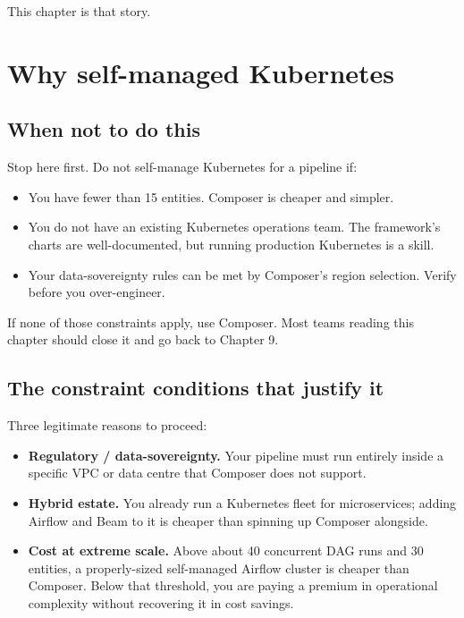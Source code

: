 \documentclass[
  11pt,
  british,
  oneside]{book}
\providecommand{\tightlist}{%
  \setlength{\itemsep}{0pt}\setlength{\parskip}{0pt}}
\begin{document}
This chapter is that story.

\hypertarget{why-self-managed-kubernetes}{%
\section{Why self-managed
Kubernetes}\label{why-self-managed-kubernetes}}

\hypertarget{when-not-to-do-this}{%
\subsection{When not to do this}\label{when-not-to-do-this}}

Stop here first. Do not self-manage Kubernetes for a pipeline if:

\begin{itemize}
\tightlist
\item
  You have fewer than 15 entities. Composer is cheaper and simpler.
\item
  You do not have an existing Kubernetes operations team. The
  framework's charts are well-documented, but running production
  Kubernetes is a skill.
\item
  Your data-sovereignty rules can be met by Composer's region selection.
  Verify before you over-engineer.
\end{itemize}

If none of those constraints apply, use Composer. Most teams reading
this chapter should close it and go back to Chapter 9.

\hypertarget{the-constraint-conditions-that-justify-it}{%
\subsection{The constraint conditions that justify
it}\label{the-constraint-conditions-that-justify-it}}

Three legitimate reasons to proceed:

\begin{itemize}
\tightlist
\item
  \textbf{Regulatory / data-sovereignty.} Your pipeline must run
  entirely inside a specific VPC or data centre that Composer does not
  support.
\item
  \textbf{Hybrid estate.} You already run a Kubernetes fleet for
  microservices; adding Airflow and Beam to it is cheaper than spinning
  up Composer alongside.
\item
  \textbf{Cost at extreme scale.} Above about 40 concurrent DAG runs and
  30 entities, a properly-sized self-managed Airflow cluster is cheaper
  than Composer. Below that threshold, you are paying a premium in
  operational complexity without recovering it in cost savings.
\end{itemize}
\end{document}
